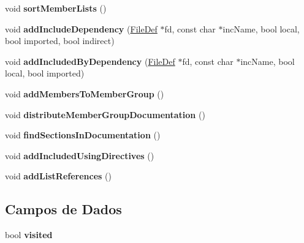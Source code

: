 \begin{DoxyCompactItemize}
\item 
\hypertarget{class_file_def_a8769ab4803a557422b86e565cb6b30d0}{void {\bfseries sort\-Member\-Lists} ()}\label{class_file_def_a8769ab4803a557422b86e565cb6b30d0}

\item 
\hypertarget{class_file_def_a2287f9baf90c5a5ec9579617b88f9728}{void {\bfseries add\-Include\-Dependency} (\hyperlink{class_file_def}{File\-Def} $\ast$fd, const char $\ast$inc\-Name, bool local, bool imported, bool indirect)}\label{class_file_def_a2287f9baf90c5a5ec9579617b88f9728}

\item 
\hypertarget{class_file_def_ab5e0d86bbeb8516c1da7dda95e94945e}{void {\bfseries add\-Included\-By\-Dependency} (\hyperlink{class_file_def}{File\-Def} $\ast$fd, const char $\ast$inc\-Name, bool local, bool imported)}\label{class_file_def_ab5e0d86bbeb8516c1da7dda95e94945e}

\item 
\hypertarget{class_file_def_ab9b8dfbf4b834e7f3e6557537a877ed9}{void {\bfseries add\-Members\-To\-Member\-Group} ()}\label{class_file_def_ab9b8dfbf4b834e7f3e6557537a877ed9}

\item 
\hypertarget{class_file_def_a2422e453d341daa281687fb6a4e7b76f}{void {\bfseries distribute\-Member\-Group\-Documentation} ()}\label{class_file_def_a2422e453d341daa281687fb6a4e7b76f}

\item 
\hypertarget{class_file_def_ad714b0e193e95efc23bb5de8dfb76cb6}{void {\bfseries find\-Sections\-In\-Documentation} ()}\label{class_file_def_ad714b0e193e95efc23bb5de8dfb76cb6}

\item 
\hypertarget{class_file_def_a7d532f2d18c4a7dc8f3d91f38be7ecd9}{void {\bfseries add\-Included\-Using\-Directives} ()}\label{class_file_def_a7d532f2d18c4a7dc8f3d91f38be7ecd9}

\item 
\hypertarget{class_file_def_a6b28c57cb8b05f6fe38f771e62b9aa17}{void {\bfseries add\-List\-References} ()}\label{class_file_def_a6b28c57cb8b05f6fe38f771e62b9aa17}

\end{DoxyCompactItemize}
\subsection*{Campos de Dados}
\begin{DoxyCompactItemize}
\item 
\hypertarget{class_file_def_a1df99df902f5f6e81ec3e21e9c07360e}{bool {\bfseries visited}}\label{class_file_def_a1df99df902f5f6e81ec3e21e9c07360e}

\end{DoxyCompactItemize}
